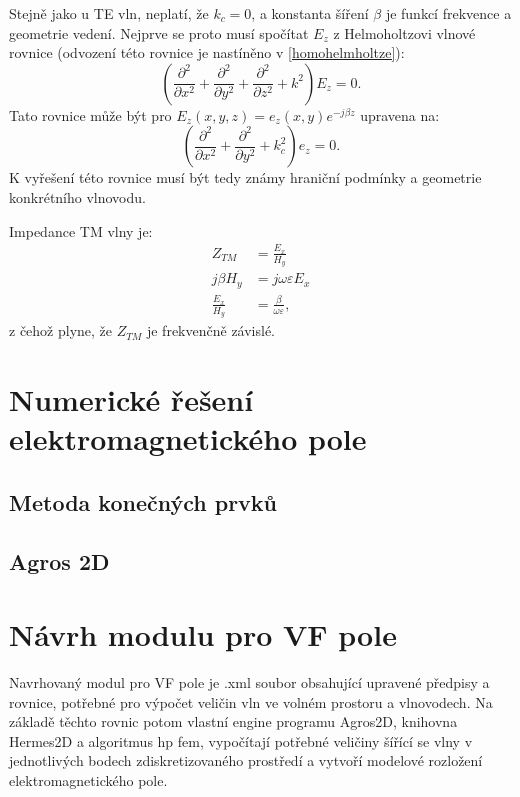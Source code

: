 \documentclass[12pt,a4paper,oneside]{article}
\numberwithin{equation}{section} %
\numberwithin{figure}{section} %
\numberwithin{table}{section} %
\begin{document}
Stejně jako u TE vln, neplatí, že $k_c = 0$, a konstanta šíření $\beta$ je funkcí frekvence a geometrie vedení. Nejprve se proto musí spočítat $E_z$ z Helmoholtzovi vlnové rovnice (odvození této rovnice je nastíněno v \ref{homohelmholtze}):
\begin{equation}
\left( \frac{\partial ^2}{\partial x^2} + \frac{\partial ^2}{\partial y^2} + \frac{\partial ^2}{\partial z^2} + k^2 \right) E_z = 0 .
\end{equation}
Tato rovnice může být pro $E_z(x,y,z) = e_z(x,y)e^{-j \beta z}$ upravena na:
\begin{equation}
\left( \frac{\partial ^2}{\partial x^2} + \frac{\partial ^2}{\partial y^2} + k^2_c \right) e_z = 0 .
\end{equation}
K vyřešení této rovnice musí být tedy známy hraniční podmínky a geometrie konkrétního vlnovodu.

Impedance TM vlny je:
\begin{subequations}
\begin{align}
Z_{TM} &= \frac{E_x}{H_y}
\\
j \beta H_y &= j \omega \varepsilon E_x
\\
\frac{E_x}{H_y} &= \frac{\beta}{\omega \varepsilon} ,
\end{align}
\end{subequations}
z čehož plyne, že $Z_{TM}$ je frekvenčně závislé.


\newpage
\section{Numerické řešení elektromagnetického pole}
\subsection{Metoda konečných prvků}
\subsection{Agros 2D}

\newpage
\section{Návrh modulu pro VF pole}
Navrhovaný modul pro VF pole je .xml soubor obsahující upravené předpisy a rovnice, potřebné pro výpočet veličin vln ve volném prostoru a vlnovodech. Na základě těchto rovnic potom vlastní engine programu Agros2D, knihovna Hermes2D a algoritmus hp fem, vypočítají potřebné veličiny šířící se vlny v jednotlivých bodech zdiskretizovaného prostředí a vytvoří modelové rozložení elektromagnetického pole.
\end{document}
